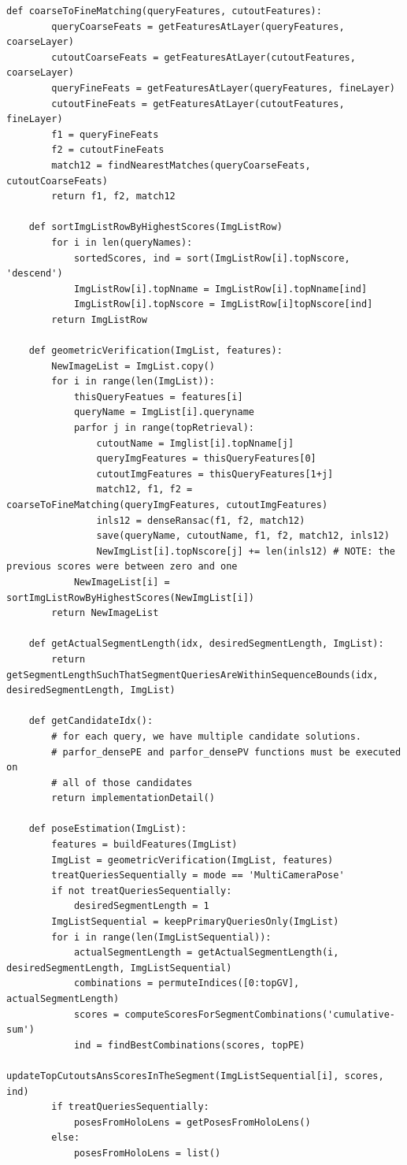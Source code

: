 \documentclass[twoside]{ctuthesis}
\theoremstyle{plain}
\theoremstyle{definition}
\theoremstyle{note}
\newcommand{\todo}[1][]{%
\ifthenelse{\isempty{#1}}{\textbf{TODO}}{\textbf{TODO: #1}}%
}
\begin{document}
\begin{lstlisting}[style=pseudocode, caption={InLocCIIRC pseudocode. \todo[pseudocode review.]}]
	def coarseToFineMatching(queryFeatures, cutoutFeatures):
		queryCoarseFeats = getFeaturesAtLayer(queryFeatures, coarseLayer)
		cutoutCoarseFeats = getFeaturesAtLayer(cutoutFeatures, coarseLayer)
		queryFineFeats = getFeaturesAtLayer(queryFeatures, fineLayer)
		cutoutFineFeats = getFeaturesAtLayer(cutoutFeatures, fineLayer)
		f1 = queryFineFeats
		f2 = cutoutFineFeats
		match12 = findNearestMatches(queryCoarseFeats, cutoutCoarseFeats)
		return f1, f2, match12

	def sortImgListRowByHighestScores(ImgListRow)
		for i in len(queryNames):
			sortedScores, ind = sort(ImgListRow[i].topNscore, 'descend')
			ImgListRow[i].topNname = ImgListRow[i].topNname[ind]
			ImgListRow[i].topNscore = ImgListRow[i]topNscore[ind]
		return ImgListRow

	def geometricVerification(ImgList, features):
		NewImageList = ImgList.copy()
		for i in range(len(ImgList)):
			thisQueryFeatues = features[i]
			queryName = ImgList[i].queryname 
			parfor j in range(topRetrieval):
				cutoutName = Imglist[i].topNname[j]
				queryImgFeatures = thisQueryFeatures[0]
				cutoutImgFeatures = thisQueryFeatures[1+j]
				match12, f1, f2 = coarseToFineMatching(queryImgFeatures, cutoutImgFeatures)
				inls12 = denseRansac(f1, f2, match12)
				save(queryName, cutoutName, f1, f2, match12, inls12)
				NewImgList[i].topNscore[j] += len(inls12) # NOTE: the previous scores were between zero and one
			NewImageList[i] = sortImgListRowByHighestScores(NewImgList[i])
		return NewImageList

	def getActualSegmentLength(idx, desiredSegmentLength, ImgList):
		return getSegmentLengthSuchThatSegmentQueriesAreWithinSequenceBounds(idx, desiredSegmentLength, ImgList)

	def getCandidateIdx():
		# for each query, we have multiple candidate solutions.
		# parfor_densePE and parfor_densePV functions must be executed on
		# all of those candidates
		return implementationDetail()

	def poseEstimation(ImgList):
		features = buildFeatures(ImgList)
		ImgList = geometricVerification(ImgList, features)
		treatQueriesSequentially = mode == 'MultiCameraPose'
		if not treatQueriesSequentially:
			desiredSegmentLength = 1
		ImgListSequential = keepPrimaryQueriesOnly(ImgList)
		for i in range(len(ImgListSequential)):
			actualSegmentLength = getActualSegmentLength(i, desiredSegmentLength, ImgListSequential)
			combinations = permuteIndices([0:topGV], actualSegmentLength)
			scores = computeScoresForSegmentCombinations('cumulative-sum')
			ind = findBestCombinations(scores, topPE)
			updateTopCutoutsAnsScoresInTheSegment(ImgListSequential[i], scores, ind)
		if treatQueriesSequentially:
			posesFromHoloLens = getPosesFromHoloLens()
		else:
			posesFromHoloLens = list()


\end{lstlisting}
\end{document}
